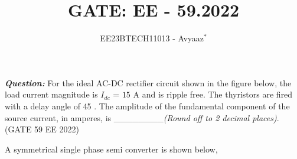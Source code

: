 \documentclass[journal,12pt,onecolumn]{IEEEtran}
\theoremstyle{remark}
\begin{document}

\vspace{3cm}

\title{GATE: EE - 59.2022}
\author{EE23BTECH11013 - Avyaaz$^{*}$%
}
\maketitle

\renewcommand{\thefigure}{\arabic{figure}}
\renewcommand{\thetable}{\arabic{table}}

\large\textbf{\textsl{Question:}}
For the ideal AC-DC rectifier circuit shown in the figure below, the load current
magnitude is $I_{dc}$ = $15$ A and is ripple free. The thyristors are fired with a delay angle
of 45\degree
. The amplitude of the fundamental component of the source current, in
amperes, is \_\_\_\_\_\_\_\_{\em (Round off to 2
decimal places)}. \hfill(GATE 59 EE 2022)
\begin{figure}[!h]
\centering

\end{figure}

\solution

\begin{table}[htbp]
\setlength{\extrarowheight}{4pt}
\setlength{\tabcolsep}{3pt}
\centering

\caption{}
\label{tab:inputs.EE.59.2022}
\end{table}
A symmetrical single phase semi converter is shown below,

\begin{figure}[!h]
\centering
 
\end{figure}
\end{document}
